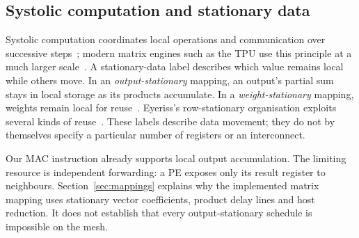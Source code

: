 \subsection{Systolic computation and stationary data}

Systolic computation coordinates local operations and communication over
successive steps~\cite{kung-leiserson,kung}; modern matrix engines such as the
TPU use this principle at a much larger scale~\cite{tpu}. A stationary-data
label describes which value remains local while others move. In an
\emph{output-stationary} mapping, an output's partial sum stays in local
storage as its products accumulate. In a \emph{weight-stationary} mapping,
weights remain local for reuse~\cite{sze-survey}. Eyeriss's row-stationary
organisation exploits several kinds of reuse~\cite{eyeriss}.
These labels describe data movement; they do not by themselves specify a
particular number of registers or an interconnect.

Our MAC instruction already supports local output accumulation. The limiting
resource is independent forwarding: a PE exposes only its result register to
neighbours. Section~\ref{sec:mappings} explains why the implemented matrix
mapping uses stationary vector coefficients, product delay lines and host
reduction. It does not establish that every output-stationary schedule is
impossible on the mesh.
